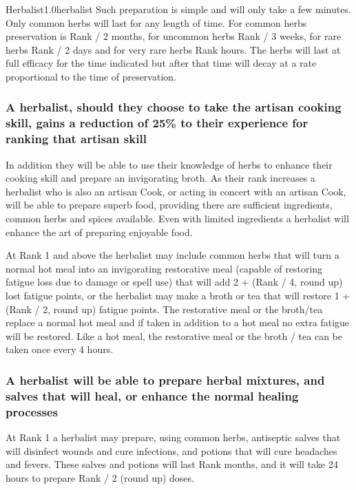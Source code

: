 \begin{skill}{Herbalist}{1.0}{herbalist}
Such preparation is simple and will only take a few minutes.  Only
common herbs will last for any length of time.  For common herbs
preservation is Rank / 2 months, for uncommon herbs Rank / 3 weeks,
for rare herbs Rank / 2 days and for very rare herbs Rank  hours.
The herbs will last at full efficacy for the time indicated but after
that time will decay at a rate proportional to the time of
preservation.

\subsubsection{A herbalist, should they choose to take the artisan
cooking skill, gains a reduction of 25\% to their experience for
ranking that artisan skill}

In addition they will be able to use their knowledge of herbs to
enhance their cooking skill and prepare an invigorating broth.  As
their rank increases a herbalist who is also an artisan Cook, or
acting in concert with an artisan Cook, will be able to prepare superb
food, providing there are sufficient ingredients, common herbs and
spices available.  Even with limited ingredients a herbalist will
enhance the art of preparing enjoyable food.

At Rank 1 and above the herbalist may include common herbs that will
turn a normal hot meal into an invigorating restorative meal (capable
of restoring fatigue loss due to damage or spell use) that will add 2
+ (Rank / 4, round up) lost fatigue points, or the herbalist may make
a broth or tea that will restore 1 + (Rank / 2, round up) fatigue
points.  The restorative meal or the broth/tea replace a normal hot
meal and if taken in addition to a hot meal no extra fatigue will be
restored.  Like a hot meal, the restorative meal or the broth / tea
can be taken once every 4 hours.

\subsubsection{A herbalist will be able to prepare herbal mixtures, and
salves that will heal, or enhance the normal healing processes}

\begin{Enumerate}

\item
At Rank 1 a herbalist may prepare, using common herbs, antiseptic
salves that will disinfect wounds and cure infections, and potions
that will cure headaches and fevers.  These salves and potions will
last Rank months, and it will take 24 hours to prepare Rank / 2 (round
up) doses.


\end{Enumerate}
\end{skill}

